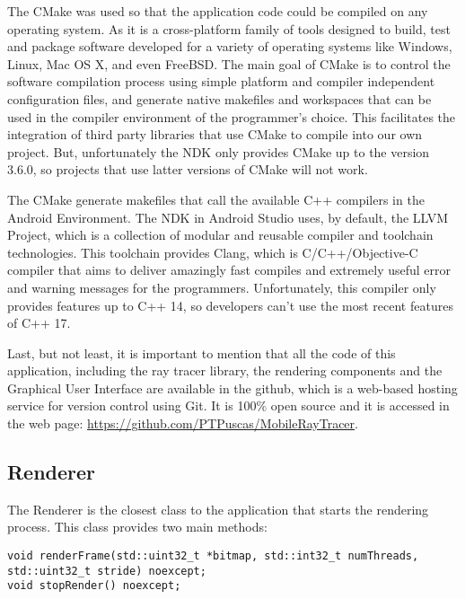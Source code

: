 \par
The CMake was used so that the application code could be compiled on any operating system.
As it is a cross-platform family of tools designed to build, test and package software developed for a variety of operating systems like Windows, Linux, Mac OS X, and even FreeBSD.
The main goal of CMake is to control the software compilation process using simple platform and compiler independent configuration files, and generate native makefiles and workspaces that can be used in the compiler environment of the programmer's choice.
This facilitates the integration of third party libraries that use CMake to compile into our own project.
But, unfortunately the NDK only provides CMake up to the version 3.6.0, so projects that use latter versions of CMake will not work.

\par
The CMake generate makefiles that call the available C++ compilers in the Android Environment.
The NDK in Android Studio uses, by default, the LLVM Project, which is a collection of modular and reusable compiler and toolchain technologies.
This toolchain provides Clang, which is C/C++/Objective-C compiler that aims to deliver amazingly fast compiles and extremely useful error and warning messages for the programmers.
Unfortunately, this compiler only provides features up to C++ 14, so developers can't use the most recent features of C++ 17.

\par
Last, but not least, it is important to mention that all the code of this application, including the ray tracer library, the rendering components and the Graphical User Interface are available in the github, which is a web-based hosting service for version control using Git.
It is 100\% open source and it is accessed in the web page:
\url{https://github.com/PTPuscas/MobileRayTracer}.

\subsection{Renderer}

\par
The Renderer is the closest class to the application that starts the rendering process.
This class provides two main methods:

\begin{lstlisting}[caption={Main methods in Renderer}, captionpos=b, label=Renderer]
void renderFrame(std::uint32_t *bitmap, std::int32_t numThreads, std::uint32_t stride) noexcept;
void stopRender() noexcept;
\end{lstlisting}

